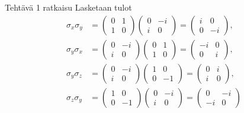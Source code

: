 \documentclass[12pt, a4paper, t]{beamer}
\theoremstyle{exercise}
\theoremstyle{remark}
\theoremstyle{definition}
\begin{document}
\begin{frame}{Tehtävä 1 ratkaisu}
\vspace{12pt}
Lasketaan tulot
\begin{align*}
\sigma_x\sigma_y & =\begin{pmatrix}0&1\\1&0\end{pmatrix}\begin{pmatrix}0& -i\\i&0\end{pmatrix}=\begin{pmatrix}i& 0\\0&-i\end{pmatrix},\\
   \sigma_y\sigma_x &=\begin{pmatrix}0& -i\\i&0\end{pmatrix}\begin{pmatrix}0&1\\1&0\end{pmatrix}=\begin{pmatrix}-i& 0\\0&i\end{pmatrix},\\
\sigma_y\sigma_z & = \begin{pmatrix}0& -i\\i&0\end{pmatrix}\begin{pmatrix}1& 0\\0&-1\end{pmatrix}
=\begin{pmatrix}0&i\\i&0\end{pmatrix},
 \\ \sigma_z\sigma_y &=\begin{pmatrix}1& 0\\0&-1\end{pmatrix}\begin{pmatrix}0& -i\\i&0\end{pmatrix}
 =\begin{pmatrix}0&-i\\-i&0\end{pmatrix}
\end{align*}
\end{frame}
\end{document}
